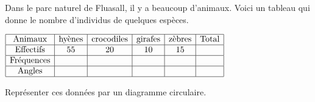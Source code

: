 \begin{exercice*}
    Dans le parc naturel de Fluasall, il y a beaucoup d'animaux.
    Voici un tableau qui donne le nombre d'individus de quelques espèces.

    \medskip
    $
    \begin{array}{|c|c|c|c|c|c|}
    \hline
    \text{Animaux} & \text{hyènes} & \text{crocodiles} & \text{girafes} & \text{zèbres} & \text{Total}\\
    \hline
    \text{Effectifs} & 55 & 20 & 10 & 15 &\\
    \hline
    \text{Fréquences} &   &   &   &  & \\
    \hline
    \text{Angles} &   &   &   &  & \\
    \hline
    \end{array}
    $


    \medskip
    Représenter ces données par un diagramme circulaire.

\end{exercice*}
